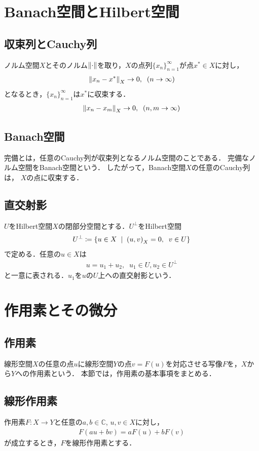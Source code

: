 \section{Banach空間とHilbert空間}

\subsection{収束列とCauchy列}
ノルム空間\(X\)とそのノルム\(\norm{\cdot}\)を取り，\(X\)の点列\(\{x_n\}^{\infty}_{n=1}\)が点\(x^*\in X\)に対し，
\begin{align}
  \norm{x_n-x^*}_X\rightarrow 0,\;\;(n\rightarrow \infty)
\end{align}
となるとき，\(\{x_n\}^{\infty}_{n=1}\)は\(x^*\)に収束する．
\begin{align}
  \norm{x_n-x_m}_X\rightarrow 0,\;\;(n,m\rightarrow \infty)
\end{align}
\subsection{Banach空間}%
完備とは，任意のCauchy列が収束列となるノルム空間のことである．
完備なノルム空間をBanach空間という．
したがって，Banach空間\(X\)の任意のCauchy列は，
\(X\)の点に収束する．
\subsection{直交射影}
\(U\)をHilbert空間\(X\)の閉部分空間とする．\(U^\bot\)をHilbert空間
\begin{align}
    U^{\bot} \coloneqq \qty{u\in X\;\;|\;\;\qty(u,v)_X=0, \;\;v\in U}
\end{align}
で定める．任意の\(u\in X\)は
\begin{align}
    u=u_1+u_2, \;\; u_1\in U,u_2\in U^\bot
\end{align}
と一意に表される．\(u_1\)を\(u\)の\(U\)上への直交射影という．
\newpage
\section{作用素とその微分}

\subsection{作用素}
線形空間\(X\)の任意の点\(u\)に線形空間\(Y\)の点\(v=F(u)\)を対応させる写像\(F\)を，\(X\)から\(Y\)への作用素という．
本節では，作用素の基本事項をまとめる．
\subsection{線形作用素}
作用素\(F:X\rightarrow Y\)と任意の\(a,b\in \mathbb{C}\), \(u,v\in X\)に対し，
\begin{align}
    F(au+bv)=aF(u)+bF(v)
\end{align}
が成立するとき，\(F\)を線形作用素とする．


